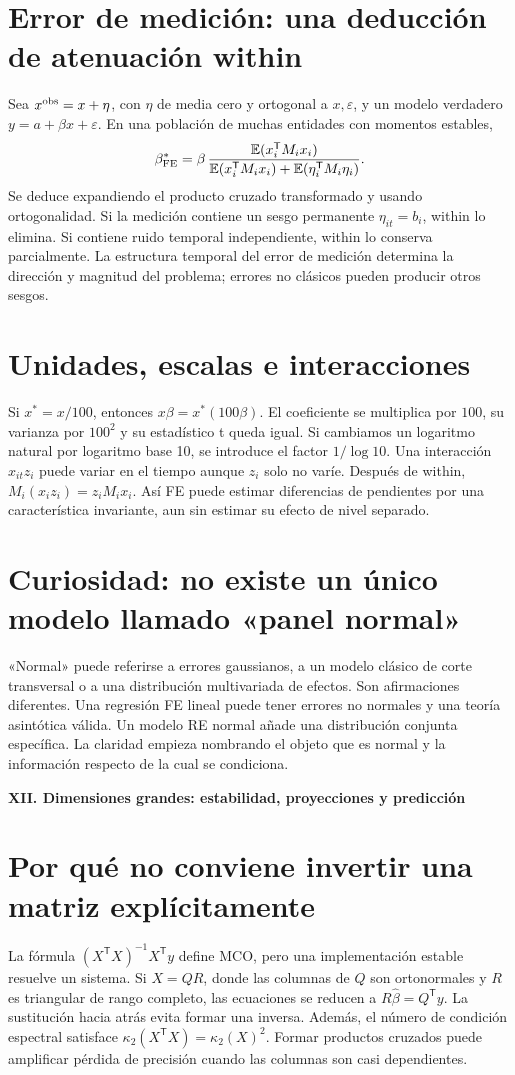 \documentclass[11pt,a4paper]{article}
\newcommand{\E}{\mathbb E}
\newcommand{\T}{^{\mathsf T}}
\theoremstyle{definition}
\newcommand{\parte}[1]{\par\bigskip\Needspace{8\baselineskip}\begin{center}{\Large\bfseries\color{azul}#1}\end{center}}
\newcounter{problema}
\newcommand{\eps}{\varepsilon}
\begin{document}
\section{Error de medición: una deducción de atenuación within}
Sea $x^{\rm obs}=x+\eta$, con $\eta$ de media cero y ortogonal a $x,\eps$, y un modelo verdadero $y=a+\beta x+\eps$.
En una población de muchas entidades con momentos estables,
\[
\beta_{\rm FE}^{*}
=\beta\,
\frac{\E(x_i\T M_ix_i)}
{\E(x_i\T M_ix_i)+\E(\eta_i\T M_i\eta_i)}.
\]
Se deduce expandiendo el producto cruzado transformado y usando ortogonalidad.
Si la medición contiene un sesgo permanente $\eta_{it}=b_i$, within lo elimina.
Si contiene ruido temporal independiente, within lo conserva parcialmente.
La estructura temporal del error de medición determina la dirección y magnitud del problema; errores no clásicos pueden producir otros sesgos.

\section{Unidades, escalas e interacciones}
Si $x^*=x/100$, entonces $x\beta=x^*(100\beta)$.
El coeficiente se multiplica por $100$, su varianza por $100^2$ y su estadístico t queda igual.
Si cambiamos un logaritmo natural por logaritmo base 10, se introduce el factor $1/\log 10$.
Una interacción $x_{it}z_i$ puede variar en el tiempo aunque $z_i$ solo no varíe.
Después de within,
$M_i(x_iz_i)=z_iM_ix_i$.
Así FE puede estimar diferencias de pendientes por una característica invariante, aun sin estimar su efecto de nivel separado.

\section{Curiosidad: no existe un único modelo llamado «panel normal»}
«Normal» puede referirse a errores gaussianos, a un modelo clásico de corte transversal o a una distribución multivariada de efectos.
Son afirmaciones diferentes.
Una regresión FE lineal puede tener errores no normales y una teoría asintótica válida.
Un modelo RE normal añade una distribución conjunta específica.
La claridad empieza nombrando el objeto que es normal y la información respecto de la cual se condiciona.



\parte{XII. Dimensiones grandes: estabilidad, proyecciones y predicción}
\section{Por qué no conviene invertir una matriz explícitamente}
La fórmula $(X\T X)^{-1}X\T y$ define MCO, pero una implementación estable resuelve un sistema.
Si $X=QR$, donde las columnas de $Q$ son ortonormales y $R$ es triangular de rango completo, las ecuaciones se reducen a
$R\widehat\beta=Q\T y$.
La sustitución hacia atrás evita formar una inversa.
Además, el número de condición espectral satisface
$\kappa_2(X\T X)=\kappa_2(X)^2$.
Formar productos cruzados puede amplificar pérdida de precisión cuando las columnas son casi dependientes.
\end{document}
